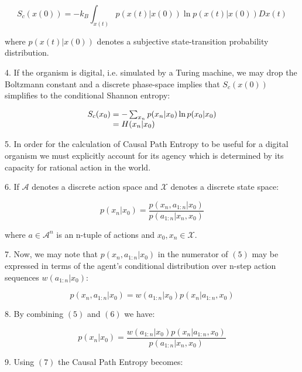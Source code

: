 \documentclass{article}
\begin{document}
\begin{equation}
S_c(x(0))=-k_B \int_{x(t)} p(x(t)|x(0))\ln p(x(t)|x(0)) Dx(t)
\end{equation}

where $p(x(t)|x(0))$ denotes a subjective state-transition probability distribution.

\newpage

4. If the organism is digital, i.e. simulated by a Turing machine, we may drop the Boltzmann constant and a discrete phase-space implies that $S_c(x(0))$ simplifies to the conditional Shannon entropy:


\begin{equation}
\begin{array}{l@{}l}
S_c(x_0) 
    &{}= -\sum_{x_n} p(x_n|x_0)\ln p(x_0|x_0) \\
    &{}= H(x_n|x_0) \\
\end{array}
\end{equation}

5. In order for the calculation of Causal Path Entropy to be useful for a digital organism we must explicitly account for its agency which is determined by its capacity for rational action in the world. 

6. If $\mathcal{A}$ denotes a discrete action space and $\mathcal{X}$ denotes a discrete state space:

\begin{equation}
p(x_n|x_0)= \frac{p(x_n,a_{1:n}|x_0)}{p(a_{1:n}|x_n,x_0)}
\end{equation}

where $a \in \mathcal{A}^n$ is an n-tuple of actions and $x_0,x_n \in \mathcal{X}$.

7. Now, we may note that $p(x_n,a_{1:n}|x_0)$ in the numerator of $(5)$ may be expressed in terms of the agent's conditional distribution over n-step action sequences $w(a_{1:n}|x_0)$:

\begin{equation}
p(x_n,a_{1:n}|x_0)= w(a_{1:n}|x_0)p(x_n|a_{1:n},x_0)
\end{equation}

8. By combining $(5)$ and $(6)$ we have:

\begin{equation}
p(x_n|x_0)= \frac{w(a_{1:n}|x_0)p(x_n|a_{1:n},x_0)}{p(a_{1:n}|x_n,x_0)}
\end{equation}

9. Using $(7)$ the Causal Path Entropy becomes:
\end{document}
